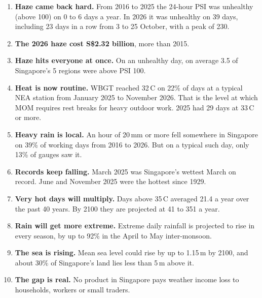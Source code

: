 \documentclass[11pt,a4paper]{article}
\newcommand{\sgd}{\textup{S\$}}
\begin{document}
\begin{tcolorbox}[breakable,colback=white,colframe=ink,boxrule=0.6pt,arc=2pt,left=6pt,right=6pt,top=4pt,bottom=4pt]
\begin{enumerate}[leftmargin=1.5em,itemsep=0.4em]
  \item \textbf{Haze came back hard.} From 2016 to 2025 the 24-hour PSI was unhealthy (above 100) on 0 to 6 days a year. In 2026 it was unhealthy on 39 days, including 23 days in a row from 3 to 25 October, with a peak of 230.\cite{team-data}
  \item \textbf{The 2026 haze cost \sgd 2.32 billion}, more than 2015.\cite{ntu-haze}
  \item \textbf{Haze hits everyone at once.} On an unhealthy day, on average 3.5 of Singapore's 5 regions were above PSI 100.\cite{team-data}
  \item \textbf{Heat is now routine.} WBGT reached 32\,\textdegree C on 22\% of days at a typical NEA station from January 2025 to November 2026.\cite{team-data} That is the level at which MOM requires rest breaks for heavy outdoor work.\cite{mom} 2025 had 29 days at 33\,\textdegree C or more.\cite{mss-2025}
  \item \textbf{Heavy rain is local.} An hour of 20\,mm or more fell somewhere in Singapore on 39\% of working days from 2016 to 2026. But on a typical such day, only 13\% of gauges saw it.\cite{team-data}
  \item \textbf{Records keep falling.} March 2025 was Singapore's wettest March on record. June and November 2025 were the hottest since 1929.\cite{mss-2025}
  \item \textbf{Very hot days will multiply.} Days above 35\,\textdegree C averaged 21.4 a year over the past 40 years. By 2100 they are projected at 41 to 351 a year.\cite{v3}
  \item \textbf{Rain will get more extreme.} Extreme daily rainfall is projected to rise in every season, by up to 92\% in the April to May inter-monsoon.\cite{v3}
  \item \textbf{The sea is rising.} Mean sea level could rise by up to 1.15\,m by 2100, and about 30\% of Singapore's land lies less than 5\,m above it.\cite{v3,nccs}
  \item \textbf{The gap is real.} No product in Singapore pays weather income loss to households, workers or small traders.\cite{ps}
\end{enumerate}
\end{tcolorbox}
\end{document}
